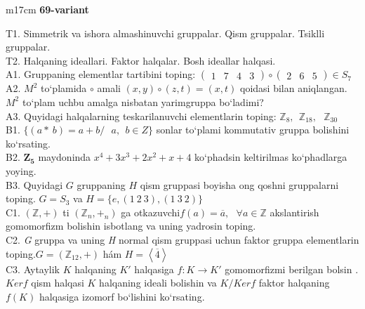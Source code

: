 \documentclass{article}
\begin{document}
\begin{tabular}{m{17cm}}
\textbf{69-variant}
\newline

T1. Simmetrik va ishora almashinuvchi gruppalar. Qism gruppalar. Tsiklli gruppalar. \\
T2. Halqaning ideallari. Faktor halqalar. Bosh ideallar halqasi. \\
A1. Gruppaning elementlar tartibini toping: \(\begin{pmatrix}
1 & 7 & 4 & 3
\end{pmatrix} \circ \begin{pmatrix}
2 & 6 & 5
\end{pmatrix} \in S_{7}\) \\
A2. \(M^{2}\) to`plamida \(\circ\) amali \((x,y) \circ (z,t) = (x,t)\) qoidasi bilan aniqlangan. \(M^{2}\) to`plam uchbu amalga nisbatan yarimgruppa bo`ladimi? \\
A3. Quyidagi halqalarning teskarilanuvchi elementlarin toping: \(\mathbb{Z}_{8},\ \ \mathbb{Z}_{18},\ \ \ \mathbb{Z}_{30}\) \\
B1. \(\{(a*\ b) = a + b/\ \ \ a,\ \ b \in Z\}\) sonlar to`plami kommutativ gruppa bolishini ko`rsating. \\
B2. \(\mathbf{Z}_{\mathbf{5}}\) maydoninda \(x^{4} + 3x^{3} + 2x^{2} + x + 4\) ko`phadsin keltirilmas ko`phadlarga yoying. \\
B3. Quyidagi \(G\) gruppaning \(H\) qism gruppasi boyisha o\textquotesingle ng qo\textquotesingle shni gruppalarni toping. \(G = S_{3}\) va \(H = \{ e,(1\ 2\ 3),(1\ 3\ 2)\}\) \\
C1. \(\left( \mathbb{Z}, + \right)\) ti \(\left( \mathbb{Z}_{n}, +_{n} \right)\) ga o\textquotesingle tkazuvchi\(f(a) = \overline{a},\ \ \ \forall a\mathbb{\in Z}\) akslantirish gomomorfizm bolishin isbotlang va uning yadrosin toping. \\
C2. \emph{G} gruppa va uning \emph{H} normal qism gruppasi uchun faktor gruppa elementlarin toping.\(G = (\mathbb{Z}_{12}, + )\) hám \(H = \left\langle \overline{4} \right\rangle\) \\
C3. Aytaylik \(K\) halqaning \(K'\) halqasiga \(f:K \rightarrow K'\) gomomorfizmi berilgan bo\textquotesingle lsin . \(Kerf\) qism halqasi \(K\) halqaning ideali bo\textquotesingle lishin va \(K/Kerf\) faktor halqaning \(f(K)\) halqasiga izomorf bo`lishini ko`rsating. \\

\end{tabular}
\vspace{1cm}
\end{document}
